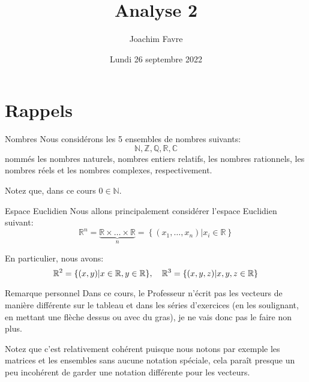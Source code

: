 \documentclass[a4paper]{article}
\title{Analyse 2}
\author{Joachim Favre}
\date{Lundi 26 septembre 2022}
\begin{document}
\maketitle


\section{Rappels}
\begin{parag}{Nombres}
    Nous considérons les 5 ensembles de nombres suivants: 
    \[\mathbb{N}, \mathbb{Z}, \mathbb{Q}, \mathbb{R}, \mathbb{C}\]
    nommés les nombres naturels, nombres entiers relatifs, les nombres rationnels, les nombres réels et les nombres complexes, respectivement.

    Notez que, dans ce cours $0 \in \mathbb{N}$.
\end{parag}

\begin{parag}{Espace Euclidien}
    Nous allons principalement considérer l'espace Euclidien suivant: 
    \[\mathbb{R}^n = \underbrace{\mathbb{R} \times \ldots \times \mathbb{R}}_{n} = \left\{\left(x_1, \ldots, x_n\right) | x_i \in \mathbb{R}\right\}\]

    En particulier, nous avons: 
    \[\mathbb{R}^2 = \left\{\left(x, y\right) | x \in \mathbb{R}, y \in \mathbb{R}\right\}, \mathspace \mathbb{R}^3 = \left\{\left(x, y, z\right) | x, y, z \in \mathbb{R}\right\}\]

    \begin{subparag}{Remarque personnel}
        Dans ce cours, le Professeur n'écrit pas les vecteurs de manière différente sur le tableau et dans les séries d'exercices (en les soulignant, en mettant une flèche dessus ou avec du gras), je ne vais donc pas le faire non plus. 

        Notez que c'est relativement cohérent puisque nous notons par exemple les matrices et les ensembles sans aucune notation spéciale, cela paraît presque un peu incohérent de garder une notation différente pour les vecteurs.
    \end{subparag}
\end{parag}
\end{document}
